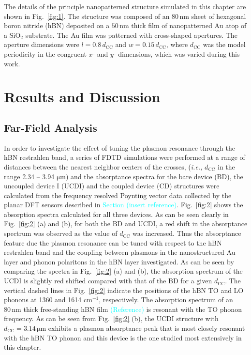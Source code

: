 \documentclass[reprint,
amsmath,amssymb,
aip,
jap,
floatfix,]{revtex4-2}
\begin{document}
			The details of the principle nanopatterned structure simulated in this chapter are shown in Fig.~\ref{fig:1}. The structure was composed of an $80\, \si{\nm}$ sheet of hexagonal boron nitride (hBN) deposited on a $50\, \si{\nm}$ thick film of nanopatterned Au atop of a $\mathrm{SiO}_{2}$ substrate. The Au film was patterned with cross-shaped apertures. The aperture dimensions were $l = 0.8 \, d_\mathrm{CC}$ and $w = 0.15 \, d_\mathrm{CC}$, where $d_\mathrm{CC}$ was the model periodicity in the congruent $x$- and $y$- dimensions, which was varied during this work.
		
		\section{Results and Discussion}
			\label{sec:R&D}
			
			\subsection{Far-Field Analysis}
			\label{sec:FFA}

				In order to investigate the effect of tuning the plasmon resonance through the hBN restrahlen band, a series of FDTD simulations were performed at a range of distances between the nearest neighbor centers of the crosses, (\textit{i.e.,} $d_\mathrm{CC}$ in the range 2.34 -- 3.94 $\si{\um}$) and the absorptance spectra for the bare device (BD), the uncoupled device I (UCDI) and the coupled device (CD) structures were calculated from the frequency resolved Poynting vector data collected by the planar DFT sensors described in \textcolor{cyan}{Section (insert reference)}.  Fig.~\ref{fig:2} shows the absorption spectra calculated for all three devices. As can be seen clearly in Fig.~\ref{fig:2} (a) and (b), for both the BD and UCDI, a red shift in the absorptance spectrum was observed as the value of $d_\mathrm{CC}$ was increased. Thus the absorptance feature due the plasmon resonance can be tuned with respect to the hBN restrahlen band and the coupling between plasmons in the nanostructured Au layer and phonon polaritons in the hBN layer investigated. As can be seen by comparing the spectra in Fig.~\ref{fig:2} (a) and (b), the absorption spectrum of the UCDI is slightly red shifted compared with that of the BD for a given $d_\mathrm{CC}$. The vertical dashed lines in  Fig.~\ref{fig:2} indicate the positions of the hBN TO and LO phonons at 1360 and 1614 $\mathrm{cm}^{-1}$, respectively. The absorption spectrum of an $80\,\si{\nm}$ thick free-standing hBN film \textcolor{cyan}{(Reference)} is resonant with the TO phonon frequency. As can be seen from Fig.~\ref{fig:2} (b), the UCDI structure with $d_\mathrm{CC} = 3.14\,\si{\um}$ exhibits a plasmon absorptance peak that is most closely resonant with the hBN TO phonon and this device is the one studied most extensively in this chapter.
\end{document}
